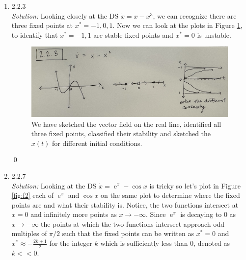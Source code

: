\documentclass[10pt]{amsart}
\DeclareMathOperator{\E}{e}
\theoremstyle{nonumberplain}
\begin{document}
\begin{enumerate}[label={\bf {\arabic*}:}]
\item 2.2.3 \\
\textit{Solution:}
Looking closely at the DS $\dot x = x - x^3$, we can recognize there are three fixed points at $x^* = -1, 0, 1$.
Now we can look at the plots in Figure \ref{fig:f1}, to identify that $x^* = -1, 1$ are stable fixed points and $x^* = 0$ is unstable.
\begin{figure}[h]
	\centering
	\includegraphics[width=1\textwidth]{2_2_3.png}
 	\caption{We have sketched the vector field on the real line, identified all three fixed points, classified their stability and sketched the $x(t)$ for different initial conditions.}\label{fig:f1}
\end{figure}

\qed \\

\newpage

\item 2.2.7 \\
\textit{Solution:} Looking at the DS $\dot x = \E^x - \cos x$ is tricky so let's plot in Figure \ref{fig:f2} each of $\E^x$ and $\cos x$ on the same plot to determine where the fixed points are and what their stability is.
Notice, the two functions intersect at $x = 0$ and infinitely more points as $x \rightarrow - \infty$.
Since $\E^x$ is decaying to 0 as $x \rightarrow - \infty$ the points at which the two functions intersect approach odd multiples of $\pi/2$ such that the fixed points can be written as $x^* = 0$ and $x^* \approx - \frac {2k + 1}{2}$ for the integer $k$ which is sufficiently less than 0, denoted as $k << 0$. \\


\end{enumerate}
\end{document}
